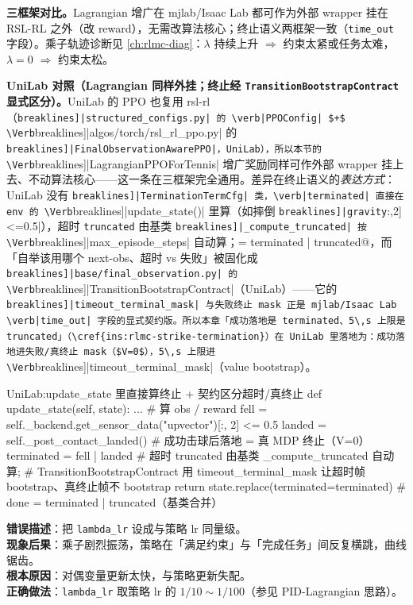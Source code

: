 \textbf{三框架对比。}Lagrangian 增广在 mjlab/Isaac Lab 都可作为外部 wrapper 挂在 RSL-RL 之外（改 reward），无需改算法核心；终止语义两框架一致（\verb|time_out| 字段）。乘子轨迹诊断见 \cref{ch:rlmc-diag}：$\lambda$ 持续上升 $\Rightarrow$ 约束太紧或任务太难，$\lambda=0$ $\Rightarrow$ 约束太松。

\textbf{UniLab 对照（Lagrangian 同样外挂；终止经 \texttt{TransitionBootstrapContract} 显式区分）。}UniLab 的 PPO 也复用 rsl-rl（\Verb[breaklines]|structured_configs.py| 的 \verb|PPOConfig| $+$ \Verb[breaklines]|algos/torch/rsl_rl_ppo.py| 的 \Verb[breaklines]|FinalObservationAwarePPO|，UniLab），所以本节的 \Verb[breaklines]|LagrangianPPOForTennis| 增广奖励同样可作外部 wrapper 挂上去、不动算法核心——这一条在三框架完全通用。差异在终止语义的\emph{表达方式}：UniLab 没有 \Verb[breaklines]|TerminationTermCfg| 类，\verb|terminated| 直接在 env 的 \Verb[breaklines]|update_state()| 里算（如摔倒 \Verb[breaklines]|gravity[:,2]<=0.5|），超时 \verb|truncated| 由基类 \Verb[breaklines]|_compute_truncated| 按 \Verb[breaklines]|max_episode_steps| 自动算；\verb@done = terminated | truncated@，而「自举该用哪个 next-obs、超时 vs 失败」被固化成 \Verb[breaklines]|base/final_observation.py| 的 \Verb[breaklines]|TransitionBootstrapContract|（UniLab）——它的 \Verb[breaklines]|timeout_terminal_mask| 与失败终止 mask 正是 mjlab/Isaac Lab \verb|time_out| 字段的显式契约版。所以本章「成功落地是 terminated、5\,s 上限是 truncated」（\cref{ins:rlmc-strike-termination}）在 UniLab 里落地为：成功落地进失败/真终止 mask（$V=0$），5\,s 上限进 \Verb[breaklines]|timeout_terminal_mask|（value bootstrap）。

\begin{codebox}[Python]{UniLab:update\_state 里直接算终止 + 契约区分超时/真终止}
def update_state(self, state):
    ...                                          # 算 obs / reward
    fell    = self._backend.get_sensor_data("upvector")[:, 2] <= 0.5
    landed  = self._post_contact_landed()        # 成功击球后落地 = 真 MDP 终止（V=0）
    terminated = fell | landed
    # 超时 truncated 由基类 _compute_truncated 自动算;
    # TransitionBootstrapContract 用 timeout_terminal_mask 让超时帧 bootstrap、真终止帧不 bootstrap
    return state.replace(terminated=terminated)  # done = terminated | truncated（基类合并）
\end{codebox}

\begin{pitfall}
\textbf{错误描述}：把 \verb|lambda_lr| 设成与策略 lr 同量级。\\
\textbf{现象后果}：乘子剧烈振荡，策略在「满足约束」与「完成任务」间反复横跳，曲线锯齿。\\
\textbf{根本原因}：对偶变量更新太快，与策略更新失配。\\
\textbf{正确做法}：\verb|lambda_lr| 取策略 lr 的 $1/10\sim1/100$（参见 PID-Lagrangian 思路）。
\end{pitfall}

